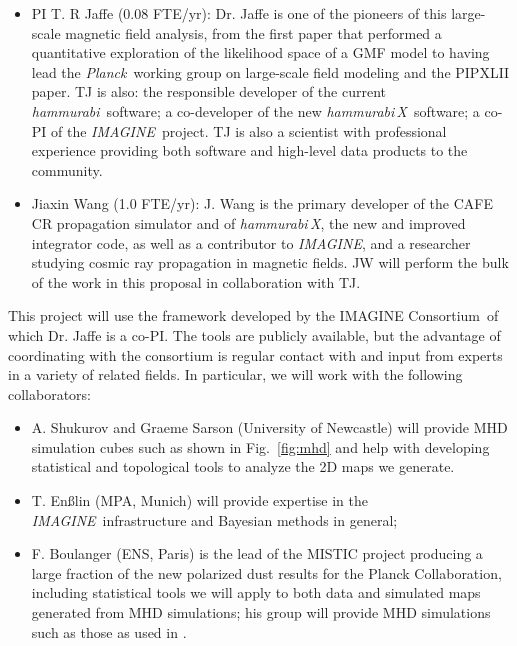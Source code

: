 \documentclass[12pt]{article}
\newcommand{\planck}{\textit{Planck}}
\newcommand{\imagineC}{IMAGINE Consortium}
\newcommand{\imagine}{\textsl{IMAGINE}}
\newcommand{\imagineSW}{\textsl{IMAGINE}}
\newcommand{\hammurabi}{\textsl{hammurabi}}
\newcommand{\hammurabix}{\textsl{hammurabi\,X}}
\begin{document}
\begin{itemize}
\item PI T. R Jaffe (0.08 FTE/yr): Dr. Jaffe is one of the pioneers of
  this large-scale magnetic field analysis, from the
  first paper that performed a quantitative exploration of the
  likelihood space of a GMF model \citep{jaffe10} to having lead the \planck\ working group on large-scale field modeling and the PIPXLII paper. TJ is also: the responsible
  developer of the current \hammurabi\ software; a co-developer of the
  new \hammurabix\ software; a co-PI of the \imagine\ project. TJ is
  also a scientist with professional experience providing both software and high-level data
  products to the community.

\item Jiaxin Wang (1.0 FTE/yr): J. Wang is the primary developer of the CAFE CR propagation simulator and of \hammurabix, the new and improved integrator code, as well as a contributor to \imagineSW, and a researcher studying cosmic ray propagation in magnetic fields.  JW will perform the bulk of the work in this proposal in collaboration with TJ.  


\end{itemize}

This project will use the framework developed by the
\imagineC\, of which Dr. Jaffe is a co-PI. The tools are publicly
available, but the advantage of coordinating with the consortium is
regular contact with and input from experts in a variety of related
fields. In particular, we will work with the following collaborators:

\begin{itemize}
\item A. Shukurov and Graeme Sarson (University of Newcastle) will 
  provide MHD simulation cubes such as shown in Fig.~\ref{fig:mhd} and
  help with developing statistical and topological tools to analyze
  the 2D maps we generate.

\item T. En{\ss}lin (MPA, Munich) will provide expertise
  in the \imagineSW\ infrastructure and Bayesian methods in general;

\item F. Boulanger (ENS, Paris) is the lead of the
  MISTIC  project producing a large fraction of the new polarized dust results
  for the Planck Collaboration, including statistical tools we will apply to both data and simulated maps generated from MHD simulations; his group will provide MHD simulations such as those as used in \citet{pipXX}.  \end{itemize}
\end{document}
